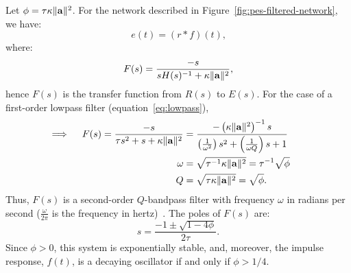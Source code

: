 \begin{theorem}
\label{thm:pes-filtered}
{\normalfont \citep{voelker2017c}}
Let $\phi = \tau \kappa \|\mathbf{a}\|^2$.
For the network described in Figure~\ref{fig:pes-filtered-network}, we have:
\begin{equation}
\label{eq:time-domain}
e(t) = (r \ast f)(t) \text{,}
\end{equation}
where: %
\begin{equation}
\label{eq:s-domain}
F(s) = \frac{-s}{s H(s)^{-1} + \kappa \|\mathbf{a}\|^2} \text{,} 
\end{equation}
hence $F(s)$ is the transfer function from $R(s)$ to $E(s)$.
For the case of a first-order lowpass filter (equation~\ref{eq:lowpass}),
\begin{align}
\label{eq:lowpass-solution}
\implies \quad F(s) = \frac{-s}{\tau s^2 + s + \kappa \|\mathbf{a}\|^2} &= \frac{-\left( \kappa \|\mathbf{a}\|^2 \right)^{-1} s}{\left(\frac{1}{\omega^2}\right)s^2 + \left(\frac{1}{\omega Q}\right) s + 1} \quad\quad \\
\omega &= \sqrt{\tau^{-1} \kappa \|\mathbf{a}\|^2 } \label{eq:bandpass-w} = \tau^{-1} \sqrt{\phi} \\
Q &= \sqrt{\tau \kappa \|\mathbf{a}\|^2 } = \sqrt{\phi} \label{eq:bandpass-Q} \text{.}
\end{align}
Thus, $F(s)$ is a second-order $Q$-bandpass filter with frequency $\omega$ in radians per second ($\frac{\omega}{2 \pi}$ is the frequency in hertz)~\citep[][pp.~8.9--8.10]{zumbahlen2011linear}.
The poles of $F(s)$ are:
\begin{equation}
\label{eq:poles}
s = \frac{-1 \pm \sqrt{1 - 4 \phi}}{2\tau} \text{.}
\end{equation}
Since $\phi > 0$, this system is exponentially stable, and, moreover, the impulse response, $f(t)$, is a decaying oscillator if and only if $\phi > 1/4$.
\end{theorem}

